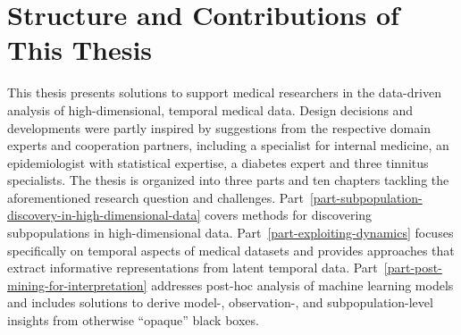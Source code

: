 \documentclass[
  oneside]{book}
\begin{document}
\hypertarget{structure-and-contributions-of-this-thesis}{%
\section{Structure and Contributions of This Thesis}\label{structure-and-contributions-of-this-thesis}}

This thesis presents solutions to support medical researchers in the data-driven analysis of high-dimensional, temporal medical data.
Design decisions and developments were partly inspired by suggestions from the respective domain experts and cooperation partners, including a specialist for internal medicine, an epidemiologist with statistical expertise, a diabetes expert and three tinnitus specialists.
The thesis is organized into three parts and ten chapters tackling the aforementioned research question and challenges.
Part~\ref{part-subpopulation-discovery-in-high-dimensional-data} covers methods for discovering subpopulations in high-dimensional data.
Part~\ref{part-exploiting-dynamics} focuses specifically on temporal aspects of medical datasets and provides approaches that extract informative representations from latent temporal data.
Part~\ref{part-post-mining-for-interpretation} addresses post-hoc analysis of machine learning models and includes solutions to derive model-, observation-, and subpopulation-level insights from otherwise ``opaque'' black boxes.
\end{document}
